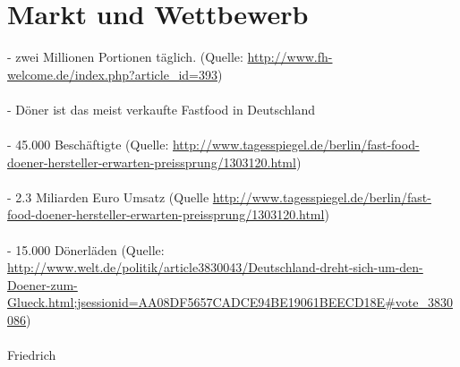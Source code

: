 
\section{Markt und Wettbewerb}
- zwei Millionen Portionen täglich. (Quelle: \url{http://www.fh-welcome.de/index.php?article_id=393})\\\\
- Döner ist das meist verkaufte Fastfood in Deutschland\\\\
- 45.000 Beschäftigte (Quelle: \url{http://www.tagesspiegel.de/berlin/fast-food-doener-hersteller-erwarten-preissprung/1303120.html})\\\\
- 2.3 Miliarden Euro Umsatz (Quelle \url{http://www.tagesspiegel.de/berlin/fast-food-doener-hersteller-erwarten-preissprung/1303120.html})\\\\
- 15.000 Dönerläden (Quelle: \url{http://www.welt.de/politik/article3830043/Deutschland-dreht-sich-um-den-Doener-zum-Glueck.html;jsessionid=AA08DF5657CADCE94BE19061BEECD18E#vote_3830086})\\\\
Friedrich